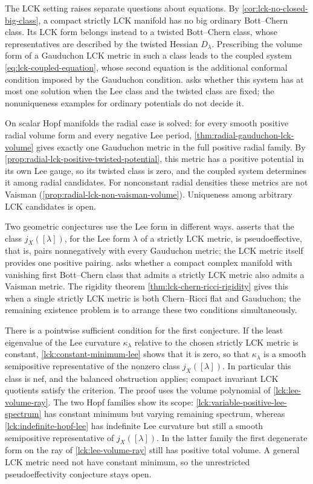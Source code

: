 The LCK setting raises separate questions about equations. By \cref{cor:lck-no-closed-big-class}, a compact strictly LCK manifold has no big ordinary Bott--Chern class. Its LCK form belongs instead to a twisted Bott--Chern class, whose representatives are described by the twisted Hessian $D_\lambda$. Prescribing the volume form of a Gauduchon LCK metric in such a class leads to the coupled system \eqref{eq:lck-coupled-equation}, whose second equation is the additional conformal condition imposed by the Gauduchon condition.  asks whether this system has at most one solution when the Lee class and the twisted class are fixed; the nonuniqueness examples for ordinary potentials do not decide it.

On scalar Hopf manifolds the radial case is solved: for every smooth positive radial volume form and every negative Lee period, \cref{thm:radial-gauduchon-lck-volume} gives exactly one Gauduchon metric in the full positive radial family. By \cref{prop:radial-lck-positive-twisted-potential}, this metric has a positive potential in its own Lee gauge, so its twisted class is zero, and the coupled system determines it among radial candidates. For nonconstant radial densities these metrics are not Vaisman (\cref{prop:radial-lck-non-vaisman-volume}). Uniqueness among arbitrary LCK candidates is open.

Two geometric conjectures use the Lee form in different ways.  asserts that the class $j_X([\lambda])$, for the Lee form $\lambda$ of a strictly LCK metric, is pseudoeffective, that is, pairs nonnegatively with every Gauduchon metric; the LCK metric itself provides one positive pairing.  asks whether a compact complex manifold with vanishing first Bott--Chern class that admits a strictly LCK metric also admits a Vaisman metric. The rigidity theorem \cref{thm:lck-chern-ricci-rigidity} gives this when a single strictly LCK metric is both Chern--Ricci flat and Gauduchon; the remaining existence problem is to arrange these two conditions simultaneously.

There is a pointwise sufficient condition for the first conjecture. If the least eigenvalue of the Lee curvature $\kappa_\lambda$ relative to the chosen strictly LCK metric is constant, \cref{lck:constant-minimum-lee} shows that it is zero, so that $\kappa_\lambda$ is a smooth semipositive representative of the nonzero class $j_X([\lambda])$. In particular this class is nef, and the balanced obstruction applies; compact invariant LCK quotients satisfy the criterion. The proof uses the volume polynomial of \cref{lck:lee-volume-ray}. The two Hopf families show its scope: \cref{lck:variable-positive-lee-spectrum} has constant minimum but varying remaining spectrum, whereas \cref{lck:indefinite-hopf-lee} has indefinite Lee curvature but still a smooth semipositive representative of $j_X([\lambda])$. In the latter family the first degenerate form on the ray of \cref{lck:lee-volume-ray} still has positive total volume. A general LCK metric need not have constant minimum, so the unrestricted pseudoeffectivity conjecture stays open.

